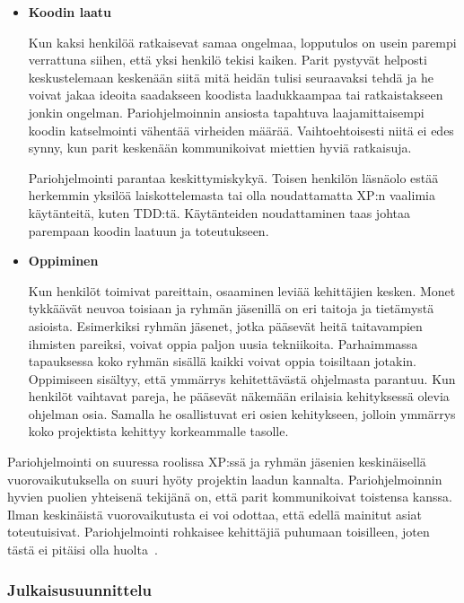 \documentclass[finnish]{../tktltiki2}
\theoremstyle{definition}
\theoremstyle{remark}
\begin{document}
\begin{itemize}

\item {\bf Koodin laatu}

Kun kaksi henkilöä ratkaisevat samaa ongelmaa, 
lopputulos on usein parempi verrattuna siihen, että yksi henkilö 
tekisi kaiken. Parit pystyvät helposti keskustelemaan keskenään siitä 
mitä heidän tulisi seuraavaksi tehdä ja he voivat jakaa ideoita 
saadakseen koodista laadukkaampaa tai ratkaistakseen jonkin ongelman.
Pariohjelmoinnin ansiosta tapahtuva laajamittaisempi koodin 
katselmointi vähentää virheiden määrää. Vaihtoehtoisesti
niitä ei edes synny, kun parit keskenään kommunikoivat miettien hyviä 
ratkaisuja.

Pariohjelmointi parantaa keskittymiskykyä. Toisen henkilön 
läsnäolo estää herkemmin yksilöä laiskottelemasta tai olla noudattamatta XP:n
vaalimia käytänteitä, kuten TDD:tä. Käytänteiden noudattaminen taas 
johtaa parempaan koodin laatuun ja toteutukseen.

\item {\bf Oppiminen}

Kun henkilöt toimivat pareittain, osaaminen 
leviää kehittäjien kesken. Monet tykkäävät neuvoa toisiaan ja ryhmän 
jäsenillä
on eri taitoja ja tietämystä asioista. Esimerkiksi ryhmän jäsenet, 
jotka pääsevät heitä taitavampien ihmisten pareiksi, voivat oppia
paljon uusia tekniikoita. Parhaimmassa tapauksessa koko ryhmän sisällä 
kaikki voivat oppia toisiltaan jotakin.
Oppimiseen sisältyy, että ymmärrys kehitettävästä ohjelmasta 
parantuu. Kun henkilöt vaihtavat
pareja, he pääsevät näkemään erilaisia 
kehityksessä olevia ohjelman osia. Samalla he osallistuvat 
eri osien
kehitykseen, jolloin ymmärrys koko projektista kehittyy korkeammalle 
tasolle.\\

\end{itemize}

Pariohjelmointi on suuressa roolissa 
XP:ssä ja ryhmän jäsenien keskinäisellä vuorovaikutuksella on suuri 
hyöty projektin laadun kannalta. Pariohjelmoinnin 
hyvien puolien yhteisenä tekijänä on, että parit kommunikoivat 
toistensa kanssa. Ilman keskinäistä vuorovaikutusta ei voi odottaa, 
että edellä mainitut asiat toteutuisivat. Pariohjelmointi 
rohkaisee kehittäjiä puhumaan toisilleen, joten tästä ei pitäisi olla 
huolta~\cite{Zarb:2012:UCW:2384716.2384738}.\\

\subsubsection{Julkaisusuunnittelu}
\end{document}
